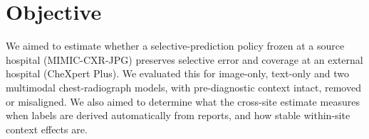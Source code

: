 \section*{Objective}

We aimed to estimate whether a selective-prediction policy frozen at a source
hospital (MIMIC-CXR-JPG) preserves selective error and coverage at an external
hospital (CheXpert Plus). We evaluated this for image-only, text-only and two
multimodal chest-radiograph models, with pre-diagnostic context intact, removed
or misaligned. We also aimed to determine what the cross-site estimate measures
when labels are derived automatically from reports, and how stable within-site
context effects are.
